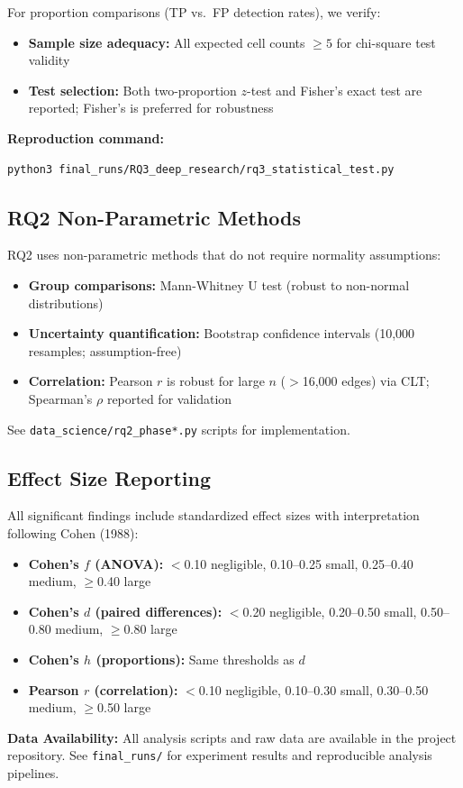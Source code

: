 For proportion comparisons (TP vs.\ FP detection rates), we verify:
\begin{itemize}[noitemsep]
    \item \textbf{Sample size adequacy:} All expected cell counts $\geq 5$ for chi-square test validity
    \item \textbf{Test selection:} Both two-proportion $z$-test and Fisher's exact test are reported; Fisher's is preferred for robustness
\end{itemize}

\textbf{Reproduction command:}
\begin{verbatim}
python3 final_runs/RQ3_deep_research/rq3_statistical_test.py
\end{verbatim}

\subsection{RQ2 Non-Parametric Methods}

RQ2 uses non-parametric methods that do not require normality assumptions:
\begin{itemize}[noitemsep]
    \item \textbf{Group comparisons:} Mann-Whitney U test (robust to non-normal distributions)
    \item \textbf{Uncertainty quantification:} Bootstrap confidence intervals (10,000 resamples; assumption-free)
    \item \textbf{Correlation:} Pearson $r$ is robust for large $n$ ($>$16,000 edges) via CLT; Spearman's $\rho$ reported for validation
\end{itemize}

See \texttt{data\_science/rq2\_phase*.py} scripts for implementation.

\subsection{Effect Size Reporting}

All significant findings include standardized effect sizes with interpretation following Cohen (1988):
\begin{itemize}[noitemsep]
    \item \textbf{Cohen's $f$ (ANOVA):} $<$0.10 negligible, 0.10--0.25 small, 0.25--0.40 medium, $\geq$0.40 large
    \item \textbf{Cohen's $d$ (paired differences):} $<$0.20 negligible, 0.20--0.50 small, 0.50--0.80 medium, $\geq$0.80 large
    \item \textbf{Cohen's $h$ (proportions):} Same thresholds as $d$
    \item \textbf{Pearson $r$ (correlation):} $<$0.10 negligible, 0.10--0.30 small, 0.30--0.50 medium, $\geq$0.50 large
\end{itemize}

\textbf{Data Availability:} All analysis scripts and raw data are available in the project repository. See \texttt{final\_runs/} for experiment results and reproducible analysis pipelines.

